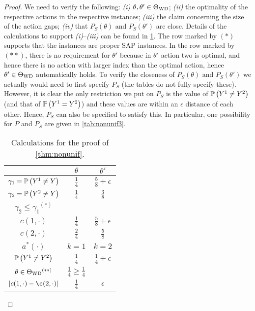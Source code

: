 \begin{proof}
We need to verify the following:
{\em (i)} $\theta,\theta'\in \Theta_{\mathrm{WD}}$;
{\em (ii)} the optimality of the respective actions in the respective instances;
{\em (iii)} the claim concerning the size of the action gaps;
{\em (iv)} that $P_S(\theta)$ and $P_S(\theta')$ are close.
Details of the calculations to support {\em (i)}--{\em (iii)} can be found in \cref{tab:nonunif2}.
The row marked by $(*)$ supports that the instances are proper SAP instances.
In the row marked by $(**)$, there is no requirement for $\theta'$ because 
in $\theta'$ action two is optimal, and hence there is no action with larger index 
than the optimal action, hence $\theta'\in \Theta_{\mathrm{WD}}$ automatically holds.
To verify the closeness of $P_S(\theta)$ and $P_S(\theta')$ we actually 
would need to first specify $P_S$ (the tables do not fully specify these).
However, it is clear the only restriction we put on $P_S$ is the value of $\mathbb{P}\left(Y^1\ne Y^2\right)$ (and
that of $\mathbb{P}\left(Y^1=Y^2\right)$) and these values are within an $\epsilon$ distance of each other.
Hence, $P_S$ can also be specified to satisfy this. In particular, one possibility for $P$ and $P_S$ are given in \cref{tab:nonunif3}.
\bgroup
\def\arraystretch{1.5}
\begin{table}[]
	\centering
	\begin{tabular}{|c|c|c|}
		\hline
		& $\theta$                & $\theta'$ \\ \hline
		$\gamma_1 = \mathbb{P}\left(Y^1\ne Y\right)$ & $\frac{1}{4}$           & $\frac{5}{8}+\epsilon$ \\ \hline
		$\gamma_2 = \mathbb{P}\left(Y^2\ne Y\right)$ & $\frac{1}{4}$           & $\frac{3}{8}$ \\ \hline
		$\gamma_2 \le \gamma_1 \mbox{}^{(*)}$        & \checkmark           & \checkmark \\ \hline
		$c(1,\cdot)$                                 & $\frac{1}{4}$           & $\frac{5}{8}+\epsilon$ \\ \hline
		$c(2,\cdot)$                                 & $\frac{2}{4}$           & $\frac{5}{8}$ \\ \hline
		$a^*(\cdot)$                                 & $k=1$                   & $k=2$ \\ \hline
		$\mathbb{P}\left(Y^1\ne Y^2\right)$                   & $\frac{1}{4}$         & $\frac{1}{4}+\epsilon$ \\ \hline
		$\theta \in \Theta_{\mathrm{WD}}  \mbox{}^{(**)}$                        & $\frac{1}{4}\ge \frac14$ \checkmark & \checkmark \\ \hline
		$|c(1,\cdot)-\c(2,\cdot)|$              & $\frac{1}{4}$         & $\epsilon$ \\ \hline
	\end{tabular}
	\vspace*{0.1in}
	\caption{Calculations for the proof of \cref{thm:nonunif}.}
	\label{tab:nonunif2}
\end{table}
\egroup


\end{proof}
